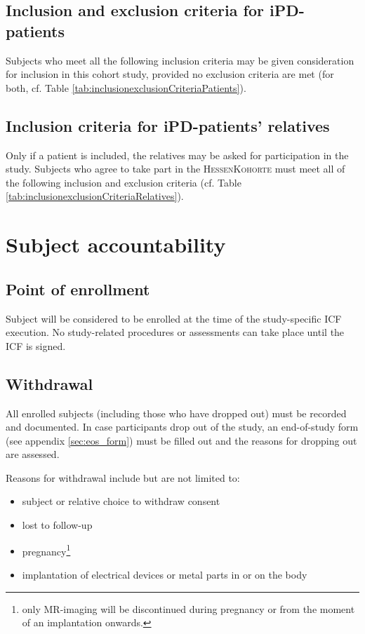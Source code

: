 \subsection{Inclusion and exclusion criteria for \ac{iPD}-patients}
\label{sec:inclusion_criteriaIPS}
Subjects who meet all the following inclusion criteria may be given consideration for inclusion in this cohort study, provided no exclusion criteria are met (for both, cf. Table \ref{tab:inclusionexclusionCriteriaPatients}).


\subsection{Inclusion criteria for \ac{iPD}-patients' relatives}
\label{sec:inclusion_criteriaREL}
Only if a patient is included, the relatives may be asked for participation in the study. Subjects who agree to take part in the \textsc{HessenKohorte} must meet all of the following inclusion and exclusion criteria (cf. Table  \ref{tab:inclusionexclusionCriteriaRelatives}).


\section{Subject accountability}
\subsection{Point of enrollment}
Subject will be considered to be enrolled at the time of the study-specific \ac{ICF} execution. No study-related procedures or assessments can take place until the \ac{ICF} is signed.

\subsection{Withdrawal}
All enrolled subjects (including those who have dropped out) must be recorded and documented. In case participants drop out of the study, an end-of-study form (see appendix \ref{sec:eos_form}) must be filled out and the reasons for dropping out are assessed. 

Reasons for withdrawal include but are not limited to:
\begin{itemize}
  \item subject or relative choice to withdraw consent
  \item lost to follow-up
  \item pregnancy\footnote{\label{note1} only MR-imaging will be discontinued during pregnancy or from the moment of an implantation onwards.}
  \item implantation of electrical devices or metal parts in or on the body
\end{itemize}

